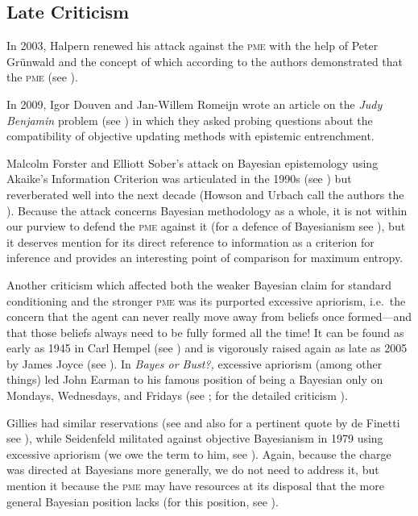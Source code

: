 \documentclass[11pt]{article}
\begin{document}
\subsection{Late Criticism}
\label{LateCriticism}

In 2003, Halpern renewed his attack against the \textsc{pme} with the
help of Peter Gr{\"u}nwald and the concept of  which according to the authors demonstrated that the
\textsc{pme}  (see
).

In 2009, Igor Douven and Jan-Willem Romeijn wrote an article on the
\emph{Judy Benjamin} problem (see ) in
which they asked probing questions about the compatibility of
objective updating methods with epistemic entrenchment.

Malcolm Forster and Elliott Sober's attack on Bayesian epistemology
using Akaike's Information Criterion was articulated in the 1990s (see
) but reverberated well into the next
decade (Howson and Urbach call the authors the ). Because the attack concerns Bayesian methodology as a
whole, it is not within our purview to defend the \textsc{pme} against
it (for a defence of Bayesianism see
), but it deserves mention for its
direct reference to information as a criterion for inference and
provides an interesting point of comparison for maximum entropy.

Another criticism which affected both the weaker Bayesian claim for
standard conditioning and the stronger \textsc{pme} was its purported
excessive apriorism, i.e.\ the concern that the agent can never really
move away from beliefs once formed---and that those beliefs always
need to be fully formed all the time! It can be found as early as 1945
in Carl Hempel (see ) and is vigorously raised
again as late as 2005 by James Joyce (see ).
In \emph{Bayes or Bust?,} excessive apriorism (among other things) led
John Earman to his famous position of being a Bayesian only on
Mondays, Wednesdays, and Fridays (see ; for the
detailed criticism ).

Gillies had similar reservations (see  and
also for a pertinent quote by de Finetti see
), while Seidenfeld militated against
objective Bayesianism in 1979 using excessive apriorism (we owe the
term to him, see ). Again, because the
charge was directed at Bayesians more generally, we do not need to
address it, but mention it because the \textsc{pme} may have resources
at its disposal that the more general Bayesian position lacks (for
this position, see ).
\end{document}
